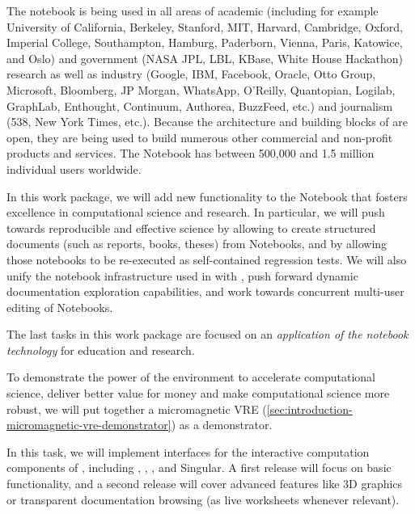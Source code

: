 \begin{workpackage}
\begin{wpdescription}
  The \Jupyter notebook is being used in all areas of academic
  (including for example University of California, Berkeley, Stanford,
  MIT, Harvard, Cambridge, Oxford, Imperial College, Southampton,
  Hamburg, Paderborn, Vienna, Paris, Katowice, and Oslo) and
  government (NASA JPL, LBL, KBase, White House Hackathon) research as
  well as industry (Google, IBM, Facebook, Oracle, Otto Group,
  Microsoft, Bloomberg, JP Morgan, WhatsApp, O’Reilly, Quantopian,
  Logilab, GraphLab, Enthought, Continuum, Authorea, BuzzFeed, etc.)
  and journalism (538, New York Times, etc.). Because the architecture
  and building blocks of \Jupyter are open, they are being used to
  build numerous other commercial and non-profit products and
  services. The \Jupyter Notebook has between 500,000 and 1.5 million
  individual users worldwide.

  In this work package, we will add new functionality to the \Jupyter
  Notebook that fosters excellence in computational science and
  research. In particular, we will push towards reproducible and
  effective science by allowing to create structured documents (such
  as reports, books, theses) from Notebooks, and by allowing those
  notebooks to be re-executed as self-contained regression tests. We
  will also unify the notebook infrastructure used in \Sage with
  \Jupyter, push forward dynamic documentation exploration
  capabilities, and work towards concurrent multi-user editing of
  Notebooks.

  The last tasks in this work package are focused on an
  \emph{application of the \Jupyter notebook technology} for education
  and research.


To demonstrate the power of the \TheProject environment to accelerate
computational science, deliver better value for money and make
computational science more robust, we will put together a micromagnetic
VRE (\ref{sec:introduction-micromagnetic-vre-demonstrator}) as a demonstrator.

\end{wpdescription}

\begin{tasklist}
\begin{task}[title=Uniform notebook interface for all interactive
    components,id=ipython-kernels,lead=PS, partners={SR,USH,USO,LL,SA,UV}]
  In this task, we will implement \Jupyter interfaces for the
  interactive computation components of \TheProject, including \GAP,
  \PariGP, \Sage, and Singular. A first release
   will focus on basic functionality,
  and a second release  will cover advanced
  features like 3D graphics or transparent documentation browsing (as
  live worksheets whenever relevant).


\end{task}
\end{tasklist}
\end{workpackage}
